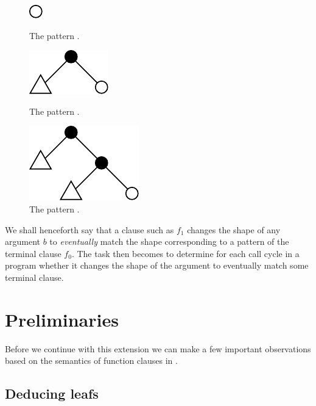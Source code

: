 \begin{figure}[htbp!]
\begin{minipage}{0.3\linewidth}
\centering
\includegraphics{figures/size-change-fail-f1-0}
\caption[]{The pattern .}
\label{figure:size-change-fail-f1-0}
\end{minipage}
\begin{minipage}{0.3\linewidth}
\centering
\includegraphics{figures/size-change-fail-f1-1}
\caption[]{The pattern .}
\label{figure:size-change-fail-f1-1}
\end{minipage}
\begin{minipage}{0.3\linewidth}
\centering
\includegraphics{figures/size-change-fail-f1-2}
\caption[]{The pattern .}
\label{figure:size-change-fail-f1-2}
\end{minipage}
\end{figure}

We shall henceforth say that a clause such as $f_1$ changes the shape of any
argument $b$ to \emph{eventually} match the shape corresponding to a pattern of
the terminal clause $f_0$. The task then becomes to determine for each call
cycle in a program whether it changes the shape of the argument to eventually
match some terminal clause.

\section{Preliminaries}

Before we continue with this extension we can make a few important observations
based on the semantics of function clauses in \D{}.

\subsection{Deducing leafs}\label{section:extend-deducing-zero}

